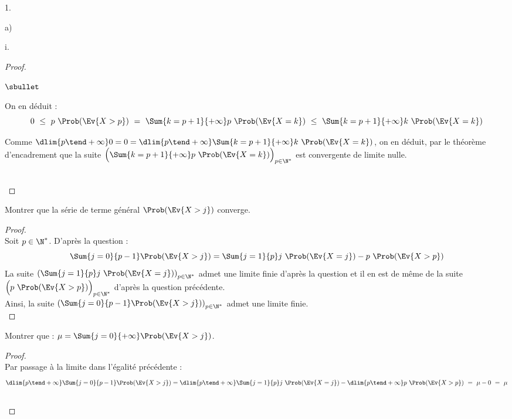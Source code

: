 \documentclass[11pt]{article}%
\begin{document}
\begin{noliste}{1.}
\begin{noliste}{a)}
\begin{nonoliste}{i.}
\begin{proof}
\begin{noliste}{$\sbullet$}
        \item On en déduit :
          \[
          0 \ \leq \ p \ \Prob(\Ev{X > p}) \ = \ \Sum{k =
            p+1}{+\infty} p \ \Prob(\Ev{X = k}) \ \leq \ \Sum{k =
            p+1}{+\infty} k \ \Prob(\Ev{X = k})
          \]

        \item Comme $\dlim{p \tend +\infty} 0 = 0 = \dlim{p \tend
            +\infty} \Sum{k = p+1}{+\infty} k \ \Prob(\Ev{X = k})$, on
          en déduit, par le théorème d'encadrement que la suite
          $\Big(\Sum{k = p+1}{+\infty} p \ \Prob(\Ev{X = k}) \Big)_{p
            \in \N^*}$ est convergente de limite nulle.
        \end{noliste}
        ~\\[-1.2cm]
      \end{proof}

    \item Montrer que la série de terme général $\Prob(\Ev{X>j})$
      converge.

      \begin{proof}~\\
        Soit $p \in \N^*$. D'après la question  :
        \[
        \Sum{j=0}{p-1} \Prob(\Ev{X > j}) = \Sum{j=1}{p} j \ \Prob(\Ev{X
          = j}) - p \ \Prob(\Ev{X > p})
        \]
        La suite $\left( \Sum{j=1}{p} j \ \Prob(\Ev{X = j}) \right)_{p
          \in \N^*}$ admet une limite finie d'après la question
         et il en est de même de la suite $\Big( p \
        \Prob(\Ev{X > p}) \Big)_{p \in \N^*}$ d'après la question
        précédente. \\ %
        Ainsi, la suite $\left( \Sum{j=0}{p-1} \Prob(\Ev{X > j})
        \right)_{p \in \N^*}$ admet une limite finie.%
        ~\\[-1cm]
    \end{proof}




  \item Montrer que : $\mu= \Sum{j=0}{+\infty} \Prob(\Ev{X >j})$.

      \begin{proof}~\\
        Par passage à la limite dans l'égalité précédente :
        \[
        \dlim{p \tend +\infty} \Sum{j=0}{p-1} \Prob(\Ev{X > j}) =
        \dlim{p \tend +\infty} \Sum{j=1}{p} j \ \Prob(\Ev{X = j}) -
        \dlim{p \tend +\infty} p \ \Prob(\Ev{X > p}) \ = \ \mu - 0 \ =
        \ \mu
        \]
        ~\\[-1cm] 
      \end{proof}
    \end{nonoliste}
    

\end{noliste}
\end{noliste}
\end{document}
